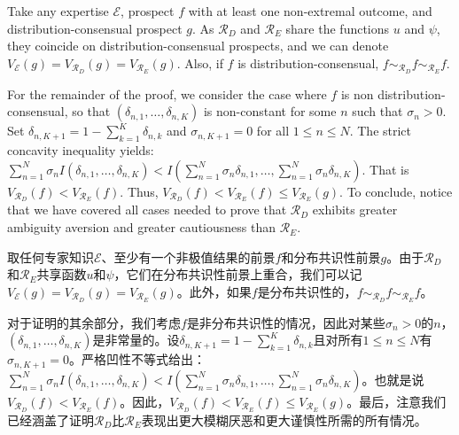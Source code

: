 \documentclass[12pt,a4paper]{article}
\newenvironment{original}
  {\par\noindent\ignorespaces}
  {\par}
\newenvironment{translation}
  {\par\noindent{\color{transblue}\ignorespaces}}
  {\par\medskip}
\begin{document}
\begin{original}
Take any expertise $\mathcal{E}$, prospect $f$ with at least one non-extremal outcome, and distribution-consensual prospect $g$. As $\mathcal{R}_{D}$ and $\mathcal{R}_{E}$ share the functions $u$ and $\psi$, they coincide on distribution-consensual prospects, and we can denote $V_{\mathcal{E}}(g) = V_{\mathcal{R}_{D}}(g) = V_{\mathcal{R}_{E}}(g)$. Also, if $f$ is distribution-consensual, $f \sim_{\mathcal{R}_{D}} f \sim_{\mathcal{R}_{E}} f$.

For the remainder of the proof, we consider the case where $f$ is non distribution-consensual, so that $(\delta_{n,1}, \dots, \delta_{n,K})$ is non-constant for some $n$ such that $\sigma_{n} > 0$. Set $\delta_{n,K+1} = 1 - \sum_{k=1}^{K} \delta_{n,k}$ and $\sigma_{n,K+1} = 0$ for all $1 \leq n \leq N$. The strict concavity inequality yields: $\sum_{n=1}^{N} \sigma_{n} I(\delta_{n,1}, \dots, \delta_{n,K}) < I\!\left(\sum_{n=1}^{N} \sigma_{n} \delta_{n,1}, \dots, \sum_{n=1}^{N} \sigma_{n} \delta_{n,K}\right)$. That is $V_{\mathcal{R}_{D}}(f) < V_{\mathcal{R}_{E}}(f)$. Thus, $V_{\mathcal{R}_{D}}(f) < V_{\mathcal{R}_{E}}(f) \leq V_{\mathcal{R}_{E}}(g)$. To conclude, notice that we have covered all cases needed to prove that $\mathcal{R}_{D}$ exhibits greater ambiguity aversion and greater cautiousness than $\mathcal{R}_{E}$.
\end{original}

\begin{translation}
取任何专家知识$\mathcal{E}$、至少有一个非极值结果的前景$f$和分布共识性前景$g$。由于$\mathcal{R}_{D}$和$\mathcal{R}_{E}$共享函数$u$和$\psi$，它们在分布共识性前景上重合，我们可以记$V_{\mathcal{E}}(g) = V_{\mathcal{R}_{D}}(g) = V_{\mathcal{R}_{E}}(g)$。此外，如果$f$是分布共识性的，$f \sim_{\mathcal{R}_{D}} f \sim_{\mathcal{R}_{E}} f$。

对于证明的其余部分，我们考虑$f$是非分布共识性的情况，因此对某些$\sigma_{n} > 0$的$n$，$(\delta_{n,1}, \dots, \delta_{n,K})$是非常量的。设$\delta_{n,K+1} = 1 - \sum_{k=1}^{K} \delta_{n,k}$且对所有$1 \leq n \leq N$有$\sigma_{n,K+1} = 0$。严格凹性不等式给出：$\sum_{n=1}^{N} \sigma_{n} I(\delta_{n,1}, \dots, \delta_{n,K}) < I\!\left(\sum_{n=1}^{N} \sigma_{n} \delta_{n,1}, \dots, \sum_{n=1}^{N} \sigma_{n} \delta_{n,K}\right)$。也就是说$V_{\mathcal{R}_{D}}(f) < V_{\mathcal{R}_{E}}(f)$。因此，$V_{\mathcal{R}_{D}}(f) < V_{\mathcal{R}_{E}}(f) \leq V_{\mathcal{R}_{E}}(g)$。最后，注意我们已经涵盖了证明$\mathcal{R}_{D}$比$\mathcal{R}_{E}$表现出更大模糊厌恶和更大谨慎性所需的所有情况。
\end{translation}
\end{document}
